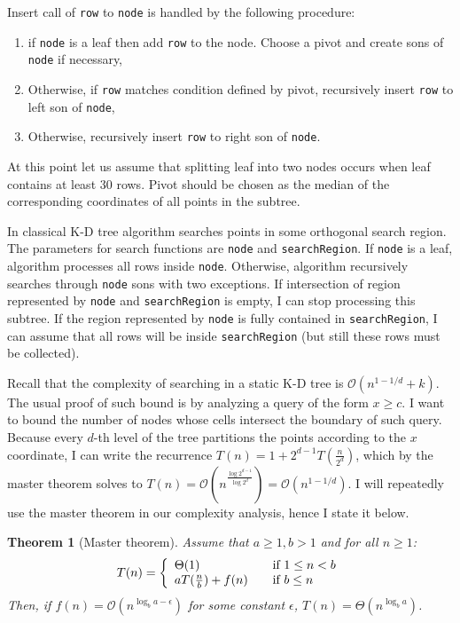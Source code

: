 \documentclass[10pt,a4paper]{article}
\newtheorem{theorem}{Theorem}
\newcommand{\Oh}{\mathcal{O}}
\begin{document}
Insert call of \verb|row| to \verb|node| is handled by the following procedure:

\begin{enumerate}
\item if \verb|node| is a leaf then add \verb|row| to the node. Choose a pivot and create sons of \verb|node| if necessary,
\item Otherwise, if \verb|row| matches condition defined by pivot, recursively insert \verb|row| to left son of \verb|node|,
\item Otherwise, recursively insert \verb|row| to right son of \verb|node|.
\end{enumerate}

At this point let us assume that splitting leaf into two nodes occurs when leaf contains at least 30 rows. Pivot should be chosen as the median of the corresponding coordinates of all points in the subtree.

In classical K-D tree algorithm searches points in some orthogonal search region. The parameters for search functions are \verb|node| and \verb|searchRegion|. If \verb|node| is a leaf, algorithm processes all rows inside \verb|node|. Otherwise, algorithm recursively searches through \verb|node| sons with two exceptions. If intersection of region represented by \verb|node| and \verb|searchRegion| is empty, I can stop processing this subtree. If the region represented by \verb|node| is fully contained in \verb|searchRegion|, I can assume that all rows will be inside \verb|searchRegion| (but still these rows must be collected).

Recall that the complexity of searching in a static K-D tree is $\Oh(n^{1-1/d} + k)$. The usual proof of such bound is by analyzing a query of the form $x \geq c$. I want to bound the number of nodes whose cells intersect the boundary of such query. Because every $d$-th level of the tree partitions the points according to the $x$ coordinate, I can write the recurrence $T(n)=1+2^{d-1}T(\frac{n}{2^{d}})$, which by the master theorem solves to $T(n)=\Oh(n^{\frac{\log 2^{d-1}}{\log 2^{d}}})=\Oh(n^{1-1/d})$. I will repeatedly use the master theorem in our complexity analysis, hence I state it below.

\begin{theorem}[Master theorem]
Assume that $a \geq 1, b > 1$ and for all $n\geq 1$:
\[
  T(n) = \left\{ 
  \begin{array}{l l}
    \Theta(1) & \quad \text{if $1 \leq n < b$}\\
    a T(\frac{n}{b}) + f(n) & \quad \text{if $b \leq n$ }\\
  \end{array} \right.
\]
Then, if $f(n)=\Oh(n^{{\log_{b}{a}} - \epsilon})$ for some constant $\epsilon$, $T(n) = \Theta(n^{\log_{b}{a}})$.
\end{theorem}
\end{document}

